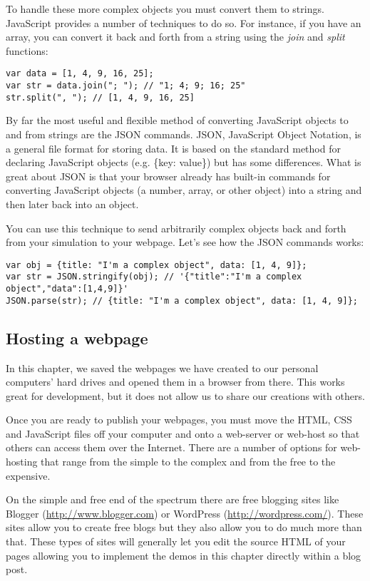 \documentclass[]{memoir}
\begin{document}
To handle these more complex objects you must convert them to strings.
JavaScript provides a number of techniques to do so. For instance, if
you have an array, you can convert it back and forth from a string using
the \emph{join} and \emph{split} functions:

\begin{lstlisting}
var data = [1, 4, 9, 16, 25];
var str = data.join("; "); // "1; 4; 9; 16; 25"
str.split(", "); // [1, 4, 9, 16, 25]
\end{lstlisting}

By far the most useful and flexible method of converting JavaScript
objects to and from strings are the JSON commands. JSON, JavaScript
Object Notation, is a general file format for storing data. It is based
on the standard method for declaring JavaScript objects (e.g. \{key:
value\}) but has some differences. What is great about JSON is that your
browser already has built-in commands for converting JavaScript objects
(a number, array, or other object) into a string and then later back
into an object.

You can use this technique to send arbitrarily complex objects back and
forth from your simulation to your webpage. Let's see how the JSON
commands works:

\begin{lstlisting}
var obj = {title: "I'm a complex object", data: [1, 4, 9]};
var str = JSON.stringify(obj); // '{"title":"I'm a complex object","data":[1,4,9]}'
JSON.parse(str); // {title: "I'm a complex object", data: [1, 4, 9]};
\end{lstlisting}

\subsection{Hosting a webpage}

In this chapter, we saved the webpages we have created to our personal
computers' hard drives and opened them in a browser from there. This
works great for development, but it does not allow us to share our
creations with others.

Once you are ready to publish your webpages, you must move the HTML, CSS
and JavaScript files off your computer and onto a web-server or web-host
so that others can access them over the Internet. There are a number of
options for web-hosting that range from the simple to the complex and
from the free to the expensive.

On the simple and free end of the spectrum there are free blogging sites
like Blogger (\url{http://www.blogger.com}) or WordPress
(\url{http://wordpress.com/}). These sites allow you to create free
blogs but they also allow you to do much more than that. These types of
sites will generally let you edit the source HTML of your pages allowing
you to implement the demos in this chapter directly within a blog post.
\end{document}
